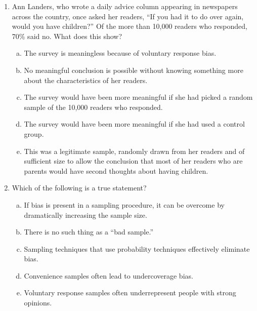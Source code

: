 \documentclass[a4paper,12pt,twoside]{book}
\begin{document}
\begin{enumerate}
    \item Ann Landers, who wrote a daily advice column appearing in newspapers across the country, once asked her readers, ``If you had it to do over again, would you have children?'' Of the more than 10,000 readers who responded, 70\% said no. What does this show?
    \begin{enumerate}[(a)]
        \item The survey is meaningless because of voluntary response bias.
        \item No meaningful conclusion is possible without knowing something more about the characteristics of her readers.
        \item  The survey would have been more meaningful if she had picked a random sample of the 10,000 readers who responded.
        \item The survey would have been more meaningful if she had used a control group.
        \item This was a legitimate sample, randomly drawn from her readers and of sufficient size to allow the conclusion that most of her readers who are parents would have second thoughts about having children.
    \end{enumerate}
    \item Which of the following is a true statement?
        \begin{enumerate}[(a)]
            \item If bias is present in a sampling procedure, it can be overcome by dramatically increasing the sample size.
            \item There is no such thing as a ``bad sample.''
            \item Sampling techniques that use probability techniques effectively eliminate bias.
            \item Convenience samples often lead to undercoverage bias.
            \item  Voluntary response samples often underrepresent people with strong opinions.
        \end{enumerate}
   

\end{enumerate}
\end{document}
